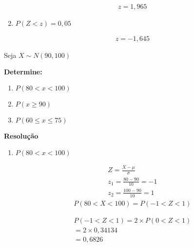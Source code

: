 \begin{example}
\begin{enumerate}[label=(\alph*)]
          \begin{align*}
            z= 1,965 
          \end{align*}
        \item $P(Z < z) = 0,05$ \begin{figure}[H] \centering
            
          \end{figure}

          \begin{align*}
            z= -1,645 
          \end{align*}
        \end{enumerate}
\end{example}
\begin{example}
  Seja $X \sim N(90,100)$ 

  \textbf{Determine:}
      \begin{enumerate}[label=(\alph*)]
        \item $P(80 < x < 100)$
        \item $P(x \geq  90)$
        \item $P(60 \leq x \leq 75 )$
      \end{enumerate}
      \textbf{Resolução}
      \begin{enumerate}[label=(\alph*)]
        \item $P(80 < x < 100)$
          \begin{figure}[H]
            \centering
            
            \label{fig:}
          \end{figure}
          \begin{align*}
            Z= \frac{X-\mu  }{\sigma} \\
            z_1 = \frac{80-90}{10}=-1\\
            z_2 = \frac{100-90}{10}=1
          \end{align*}
          \begin{align*}
            P(80<X < 100) = P(-1 < Z <1)
          \end{align*} 
          \begin{figure}[H]
            \centering
            
            \label{fig:}
          \end{figure}

          \begin{align*}
            P(-1 < Z < 1)  = 2 \times P(0<Z < 1) \\
            = 2 \times 0,34134 \\
            =0,6826
          \end{align*}


\end{enumerate}
\end{example}
